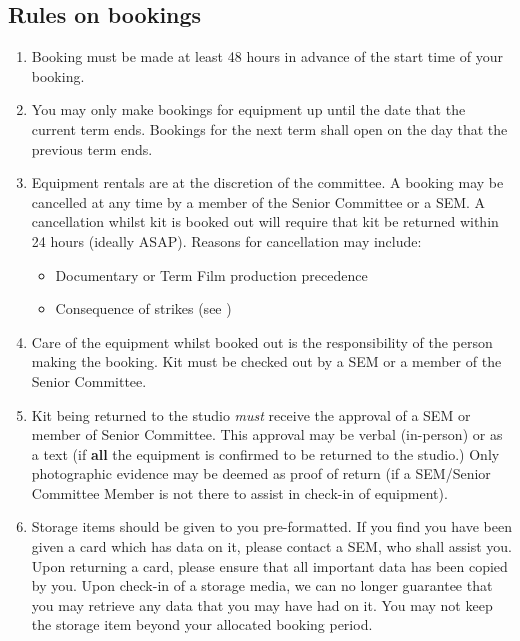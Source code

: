 \documentclass[]{article}
\begin{document}
\subsection{Rules on bookings}
\begin{enumerate}
    \item Booking must be made at least 48 hours in advance of the start time of your booking.
    \item You may only make bookings for equipment up until the date that the current term ends. Bookings for the next term shall open on the day that the previous term ends.
    \item Equipment rentals are at the discretion of the committee. A booking may be cancelled at any time by a member of the Senior Committee or a SEM. A cancellation whilst kit is booked out will require that kit be returned within 24 hours (ideally ASAP). Reasons for cancellation may include:
          \begin{itemize}
              \item Documentary or Term Film production precedence
              \item Consequence of strikes (see )
          \end{itemize}
    \item Care of the equipment whilst booked out is the responsibility of the person making the booking. Kit must be checked out by a SEM or a member of the Senior Committee.
    \item Kit being returned to the studio \textit{must} receive the approval of a SEM or member of Senior Committee. This approval may be verbal (in-person) or as a text (if \textbf{all} the equipment is confirmed to be returned to the studio.) Only photographic evidence may be deemed as proof of return (if a SEM/Senior Committee Member is not there to assist in check-in of equipment).
    \item Storage items should be given to you pre-formatted. If you find you have been given a card which has data on it, please contact a SEM, who shall assist you. Upon returning a card, please ensure that all important data has been copied by you. Upon check-in of a storage media, we can no longer guarantee that you may retrieve any data that you may have had on it. You may not keep the storage item beyond your allocated booking period.
\end{enumerate}
\end{document}
